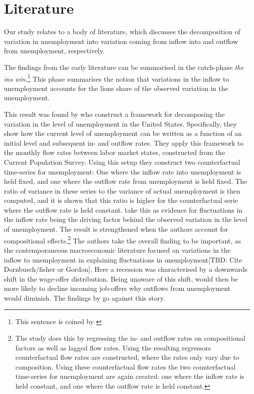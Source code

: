 \section{Literature}

Our study relates to a body of literature, which discusses the decomposition of variation in unemployment into variation coming from inflow into and outflow from unemployment, respectively. 

The findings from the early literature can be summarised in the catch-phase \emph{the ins win}.\footnote{This sentence is coined by \cite{Darby1986}} This phase summarises the notion that variations in the inflow to unemployment accounts for the lions share of the observed variation in the unemployment.

This result was found by \cite{Darby1986} who construct a framework for decomposing the variation in the level of unemployment in the United States. Specifically, they show how the current level of unemployment can be written as a function of an initial level and subsequent in- and outflow rates. They apply this framework to the monthly flow rates between labor market states, constructed from the Current Population Survey. Using this setup they construct two counterfactual time-series for unemployment: One where the inflow rate into unemployment is held fixed, and one where the outflow rate from unemployment is held fixed. The ratio of variance in these series to the variance of actual unemployment is then computed, and it is shown that this ratio is higher for the counterfactual serie where the outflow rate is held constant. \cite{Darby1986} take this as evidence for fluctuations in the inflow rate being the driving factor behind the observed variation in the level of unemployment. The result is strengthened when the authors account for compositional effects.\footnote{The study does this by regressing the in- and outflow rates on compositional factors as well as lagged flow  rates. Using the resulting regressors counterfactual flow rates are constructed, where the rates only vary due to composition. Using these counterfactual flow rates the two counterfactual time-series for unemployment are again created: one where the inflow rate is held constant, and one where the outflow rate is held constant.}  The authors take the overall finding to be important, as the contemporaneous macroeconomic literature focused on variations in the inflow to unemployment in explaining fluctuations in unemployment[TBD: Cite Dornbusch/fisher or Gordon]. Here a recession was characterised by a downwards shift in the wage-offer distribution. Being unaware of this shift, would then be more likely to decline incoming job-offers why outflows from unemployment would diminish. The findings by \cite{Darby1986} go against this story.

